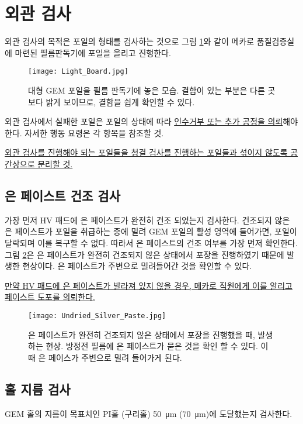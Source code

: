 \section{외관 검사}
외관 검사의 목적은 포일의 형태를 검사하는 것으로 그림 \ref{fig:light_board}와 같이 메카로 품질검증실에 마련된 필름판독기에 포일을 올리고 진행한다.

\begin{figure}[htb]
  \centering
  \texttt{[image: Light\_Board.jpg]}
  \caption[대형 GEM 포일을 필름 판독기에 놓은 모습]{대형 GEM 포일을 필름 판독기에 놓은 모습. 결함이 있는 부분은 다른 곳보다 밝게 보이므로, 결함을 쉽게 확인할 수 있다.}
  \label{fig:light_board}
\end{figure}

외관 검사에서 실패한 포일은 포일의 상태에 따라 \uline{인수거부 또는 추가 공정을 의뢰}해야 한다. 자세한 행동 요령은 각 항목을 참조할 것.

\uline{외관 검사를 진행해야 되는 포일들을 청결 검사를 진행하는 포일들과 섞이지 않도록 공간상으로 분리할 것.} 

\subsection{은 페이스트 건조 검사}
가장 먼저 HV 패드에 은 페이스트가 완전히 건조 되었는지 검사한다. 건조되지 않은 은 페이스트가 포일을 취급하는 중에 밀려 GEM 포일의 활성 영역에 들어가면, 포일이 달락되며 이를 복구할 수 없다. 따라서 은 페이스트의 건조 여부를 가장 먼저 확인한다. 그림 \ref{fig:undried_paste}은 은 페이스트가 완전히 건조되지 않은 상태에서 포장을 진행하였기 때문에 발생한 현상이다. 은 페이스트가 주변으로 밀려들어간 것을 확인할 수 있다.

\uline{만약 HV 패드에 은 페이스트가 발라져 있지 않을 경우, 메카로 직원에게 이를 알리고 페이스트 도포를 의뢰한다.}

\begin{figure}[htb]
  \centering
  \texttt{[image: Undried\_Silver\_Paste.jpg]}
  \caption[건조되지 않은 은 페이스트]{은 페이스트가 완전히 건조되지 않은 상태에서 포장을 진행했을 때, 발생하는 현상. 방정전 필름에 은 페이스트가 묻은 것을 확인 할 수 있다. 이 때 은 페이스가 주변으로 밀려 들어가게 된다.}
  \label{fig:undried_paste}
\end{figure}

\subsection{홀 지름 검사}
GEM 홀의 지름이 목표치인 PI홀 (구리홀) \SI{50}{\micro\meter} (\SI{70}{\micro\meter})에 도달했는지 검사한다.


